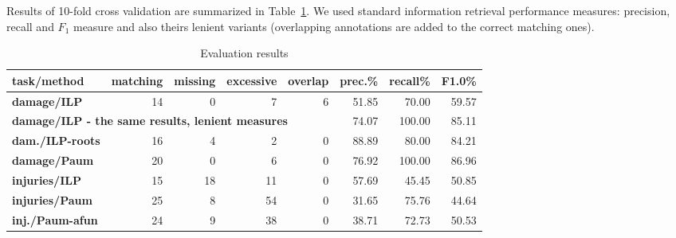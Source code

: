 \documentclass[runningheads,a4paper]{llncs}
\begin{document}


Results of 10-fold cross validation are summarized in Table~\ref{tab:EvaluationResults}. We used standard information retrieval performance measures: precision, recall and $F_1$ measure and also theirs lenient variants (overlapping annotations are added to the correct matching ones).

\begin{table}[t]
	\centering
			
\begin{tabular}{|l||r|r|r|r|r|r|r|}
\hline
\textbf{task/method} & \textbf{matching} & \textbf{missing} & \textbf{excessive} & \textbf{overlap} & \textbf{prec.}\% & \textbf{recall}\% & \textbf{F1.0}\%\\
\hline
\hline
\textbf{damage/ILP} & 14 & 0 & 7 & 6 & 51.85 & 70.00 & 59.57\\
\hline
\multicolumn{5}{|l|}{\textbf{damage/ILP - the same results, lenient measures}} & 74.07 & 100.00 & 85.11\\
\hline
\textbf{dam./ILP-roots} & 16 & 4 & 2 & 0 & 88.89 & 80.00 & 84.21\\
\hline
\textbf{damage/Paum} & 20 & 0 & 6 & 0 & 76.92 & 100.00 & 86.96\\
\hline
\hline
\textbf{injuries/ILP} & 15 & 18 & 11 & 0 & 57.69 & 45.45 & 50.85\\
\hline
\textbf{injuries/Paum} & 25 & 8 & 54 & 0 & 31.65 & 75.76 & 44.64\\
\hline
\textbf{inj./Paum-afun} & 24 & 9 & 38 & 0 & 38.71 & 72.73 & 50.53\\
\hline
\end{tabular}
						
	\caption{Evaluation results }
	\label{tab:EvaluationResults}
\end{table}
\end{document}
